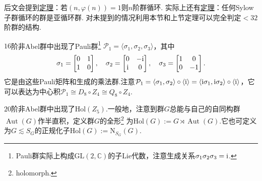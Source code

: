 \begin{remark}
	后文会提到\hyperlink{thm:CyclicFromOrder}{定理}：若$(n,\varphi(n))=1$则$n$阶群循环.
	实际上还有\hyperlink{thm:CyclicSylowMetacyclic}{定理}：任何Sylow子群循环的群是亚循环群.
	对未提到的情况利用本节和上节定理可以完全判定$<32$阶群的结构.
\end{remark}
\begin{remark}
	$16$阶非Abel群中出现了{\heiti Pauli群}\footnote{Pauli群实际上构成$\mathrm{GL}(2,\mathbb{C})$的子Lie代数，注意生成关系$\sigma_1\sigma_2\sigma_3=\mathrm{i}$.} $\mathcal{P}_1=\langle \sigma_1,\sigma_2,\sigma_3\rangle $，其中
	\[
		\sigma_1=\begin{bmatrix}
			0&1\\
			1&0
		\end{bmatrix},\quad\sigma_2=\begin{bmatrix}
			0&-\mathrm{i}\\
			\mathrm{i}&0
		\end{bmatrix},\quad\sigma_3=\begin{bmatrix}
			1&0\\
			0&-1
		\end{bmatrix}.
	\]
	它是由这些Pauli矩阵和生成的乘法群.注意$\mathcal{P}_1=\langle \sigma_1,\sigma_2\rangle \circ\langle \mathrm{i}\rangle=\langle \mathrm{i}\sigma_1,\mathrm{i}\sigma_2\rangle \circ\langle \mathrm{i}\rangle  $，它可以表达为中心积$\mathcal{P}_1\cong D_8\circ Z_4\cong Q_8\circ Z_4$.
\end{remark}
\begin{remark}
	$20$阶非Abel群中出现了$\mathrm{Hol}(Z_5)$.一般地，注意到群$G$总能与自己的自同构群$\operatorname*{Aut}(G)$作半直积，定义群$G$的{\heiti 全形}\footnote{holomorph.} 为$\mathrm{Hol}(G):=G\rtimes\operatorname*{Aut}(G)$.它也可定义为$G\lesssim S_G$的正规化子$\mathrm{Hol}(G):=\mathrm{N}_{S_G}(G)$.
\end{remark}

